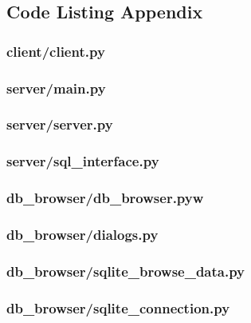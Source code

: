 \documentclass[a4paper]{article}
\begin{document}
    \subsection{Code Listing Appendix}
    \newpage
        \subsubsection{client/client.py}
        \label{sec:client.py}
        

        \subsubsection{server/main.py}
        \label{sec:main.py}
        

        \subsubsection{server/server.py}
        \label{sec:server.py}
        

        \subsubsection{server/sql\_interface.py}
        \label{sec:sqlinterface.py}
        

        \subsubsection{db\_browser/db\_browser.pyw}
        \label{sec:dbbrowser.py}
        

        \subsubsection{db\_browser/dialogs.py}
        \label{sec:dialogs.py}
        

        \subsubsection{db\_browser/sqlite\_browse\_data.py}
        \label{sec:browsedata.py}
        

        \subsubsection{db\_browser/sqlite\_connection.py}
        \label{sec:connection.py}
        
\end{document}
